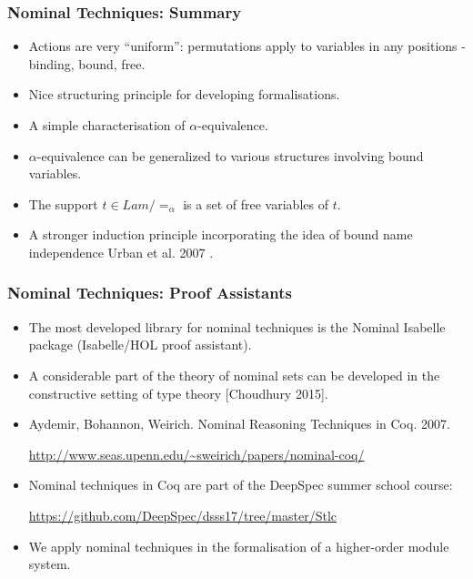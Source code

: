 \documentclass[10pt]{beamer}
\begin{document}
\begin{frame}
  \frametitle{Nominal Techniques: Summary}
  \begin{itemize}
  \item Actions are very ``uniform'': permutations apply to
    variables in any positions - binding, bound, free.
    \pause
  \item Nice structuring principle for developing formalisations.
    \pause
  \item A simple characterisation of $\alpha$-equivalence.
    \pause
  \item $\alpha$-equivalence can be generalized to various structures
    involving bound variables.
    \pause
  \item The support $t \in Lam/=_\alpha$ is a set of free variables of $t$.
    \pause
  \item A stronger induction principle incorporating the idea
    of bound name independence \lbrack Urban et al. 2007 \rbrack.
  \end{itemize}
\end{frame}

\begin{frame}
  \frametitle{Nominal Techniques: Proof Assistants}
  \begin{itemize}
  \item The most developed library for nominal techniques is the Nominal
    Isabelle package (Isabelle/HOL proof assistant).
  \item A considerable part of the theory of nominal sets can be
    developed in the constructive setting of type theory [Choudhury 2015].
  \item Aydemir, Bohannon, Weirich. Nominal Reasoning Techniques in Coq. 2007.

    \small{\url{http://www.seas.upenn.edu/~sweirich/papers/nominal-coq/}}
  \item Nominal techniques in Coq are part of the DeepSpec summer school course:

    \small\url{https://github.com/DeepSpec/dsss17/tree/master/Stlc}
  \item We apply nominal techniques in the formalisation of a
    higher-order module system.
  \end{itemize}
\end{frame}
\end{document}
